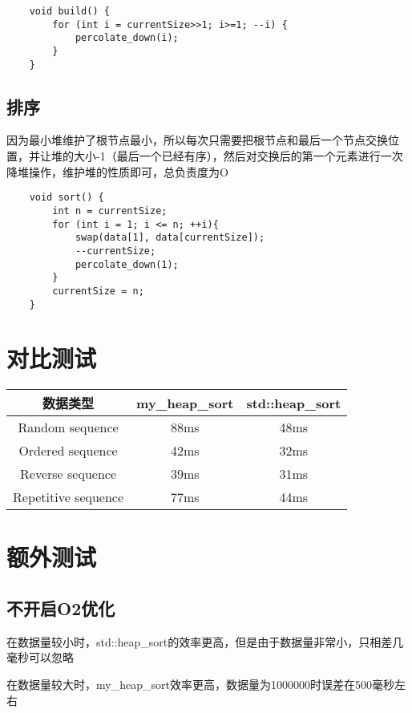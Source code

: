 \documentclass[UTF8]{ctexart}
\begin{document}
\begin{lstlisting}
    void build() {
        for (int i = currentSize>>1; i>=1; --i) {
            percolate_down(i);
        }
    }
\end{lstlisting}

\subsection{排序}
因为最小堆维护了根节点最小，所以每次只需要把根节点和最后一个节点交换位置，并让堆的大小-1（最后一个已经有序），然后对交换后的第一个元素进行一次降堆操作，维护堆的性质即可，总负责度为O

\begin{lstlisting}
    void sort() {
        int n = currentSize;
        for (int i = 1; i <= n; ++i){
            swap(data[1], data[currentSize]);
            --currentSize;
            percolate_down(1);
        }
        currentSize = n;
    }
\end{lstlisting}

\section{对比测试}

\begin{tabular}{|c|c|c|}
\hline
数据类型 & my\_heap\_sort & std::heap\_sort\\
\hline
Random sequence & 88ms & 48ms\\
\hline
Ordered sequence & 42ms & 32ms\\
\hline
Reverse sequence & 39ms &31ms\\
\hline
Repetitive sequence &77ms & 44ms\\
\hline

\end{tabular}

\section{额外测试}
    
\subsection{不开启O2优化}
在数据量较小时，std::heap\_sort的效率更高，但是由于数据量非常小，只相差几毫秒可以忽略

在数据量较大时，my\_heap\_sort效率更高，数据量为1000000时误差在500毫秒左右
\end{document}
